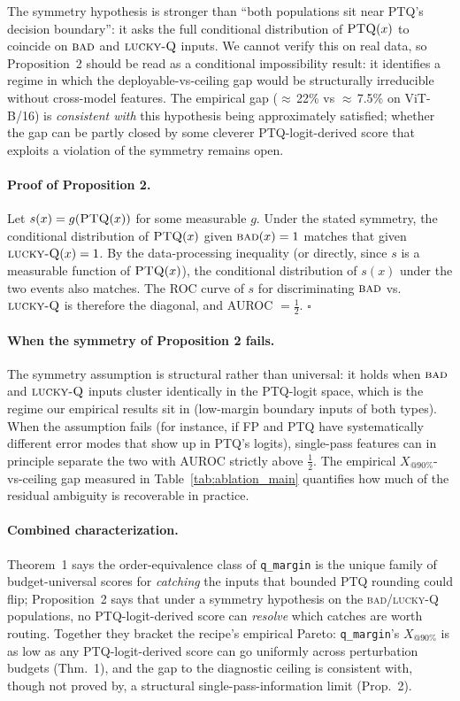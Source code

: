 \documentclass{article}
\makeatletter
\newcommand{\fp}{\textsc{FP}\xspace}
\newcommand{\ptq}{\textsc{PTQ}\xspace}
\newcommand{\bad}{\textsc{bad}\xspace}
\newcommand{\luckyq}{\textsc{lucky-Q}\xspace}
\newcommand{\xat}[1]{\ensuremath{X_{@#1\%}}}
\makeatother
\begin{document}
The symmetry hypothesis is stronger than ``both populations sit near \ptq's decision boundary'': it asks the full conditional distribution of $\ptq(x)$ to coincide on $\bad$ and $\luckyq$ inputs. We cannot verify this on real data, so Proposition~2 should be read as a conditional impossibility result: it identifies a regime in which the deployable-vs-ceiling gap would be structurally irreducible without cross-model features. The empirical gap ($\approx$\,22\% vs $\approx$\,7.5\% on ViT-B/16) is \emph{consistent with} this hypothesis being approximately satisfied; whether the gap can be partly closed by some cleverer \ptq-logit-derived score that exploits a violation of the symmetry remains open.

\paragraph{Proof of Proposition 2.}
Let $s(x) = g(\ptq(x))$ for some measurable $g$. Under the stated symmetry, the conditional distribution of $\ptq(x)$ given $\bad(x)=1$ matches that given $\luckyq(x)=1$. By the data-processing inequality (or directly, since $s$ is a measurable function of $\ptq(x)$), the conditional distribution of $s(x)$ under the two events also matches. The ROC curve of $s$ for discriminating $\bad$ vs.\ $\luckyq$ is therefore the diagonal, and AUROC $= \tfrac12$. \hfill$\square$

\paragraph{When the symmetry of Proposition 2 fails.}
The symmetry assumption is structural rather than universal: it holds when $\bad$ and $\luckyq$ inputs cluster identically in the \ptq-logit space, which is the regime our empirical results sit in (low-margin boundary inputs of both types). When the assumption fails (for instance, if \fp{} and \ptq{} have systematically different error modes that show up in \ptq{}'s logits), single-pass features can in principle separate the two with AUROC strictly above $\tfrac12$. The empirical \xat{90}-vs-ceiling gap measured in Table~\ref{tab:ablation_main} quantifies how much of the residual ambiguity is recoverable in practice.

\paragraph{Combined characterization.}
Theorem~1 says the order-equivalence class of \texttt{q\_margin} is the unique family of budget-universal scores for \emph{catching} the inputs that bounded \ptq{} rounding could flip; Proposition~2 says that under a symmetry hypothesis on the \bad{}/\luckyq{} populations, no \ptq-logit-derived score can \emph{resolve} which catches are worth routing. Together they bracket the recipe's empirical Pareto: \texttt{q\_margin}'s \xat{90} is as low as any \ptq-logit-derived score can go uniformly across perturbation budgets (Thm.~1), and the gap to the diagnostic ceiling is consistent with, though not proved by, a structural single-pass-information limit (Prop.~2).
\end{document}
